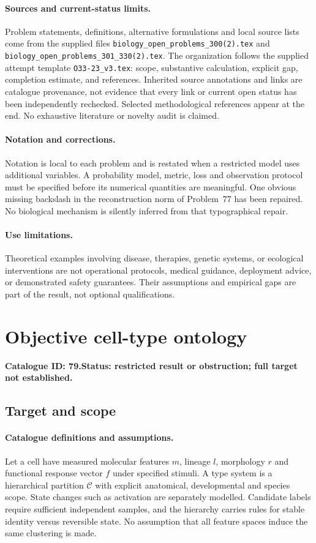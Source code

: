 \documentclass[11pt]{article}
\begin{document}
\paragraph{Sources and current-status limits.}
Problem statements, definitions, alternative formulations and local source lists
come from the supplied files
\texttt{biology\_open\_problems\_300(2).tex} and
\texttt{biology\_open\_problems\_301\_330(2).tex}.
The organization follows the supplied attempt template
\texttt{O33-23\_v3.tex}: scope, substantive calculation, explicit gap,
completion estimate, and references. Inherited source annotations and links are
catalogue provenance, not evidence that every link or current open status has
been independently rechecked. Selected methodological references appear at the
end. No exhaustive literature or novelty audit is claimed.

\paragraph{Notation and corrections.}
Notation is local to each problem and is restated when a restricted model uses
additional variables. A probability model, metric, loss and observation protocol
must be specified before its numerical quantities are meaningful. One obvious
missing backslash in the reconstruction norm of Problem~77 has been repaired.
No biological mechanism is silently inferred from that typographical repair.

\paragraph{Use limitations.}
Theoretical examples involving disease, therapies, genetic systems, or ecological
interventions are not operational protocols, medical guidance, deployment advice,
or demonstrated safety guarantees. Their assumptions and empirical gaps are part
of the result, not optional qualifications.

\setcounter{section}{78}
\section{Objective cell-type ontology}
\label{prob:079}
\noindent\textbf{Catalogue ID: 79.}\quad \textbf{Status: restricted result or obstruction; full target not established.}
\subsection{Target and scope}
\paragraph{Catalogue definitions and assumptions.}
Let a cell have measured molecular features $m$, lineage $l$, morphology $r$ and functional response vector $f$ under specified stimuli. A type system is a hierarchical partition $\mathcal C$ with explicit anatomical, developmental and species scope. State changes such as activation are separately modelled. Candidate labels require sufficient independent samples, and the hierarchy carries rules for stable identity versus reversible state. No assumption that all feature spaces induce the same clustering is made.
\end{document}
